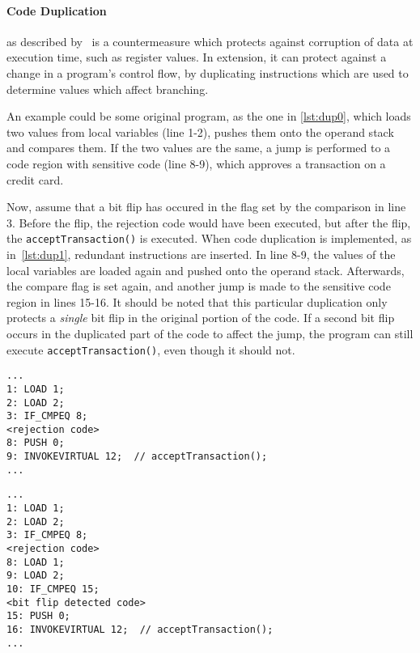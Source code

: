 \paragraph{Code Duplication}as described by~\cite[p. 12]{javasec} is a countermeasure which protects against corruption of data at execution time, such as register values. In extension, it can protect against a change in a program's control flow, by duplicating instructions which are used to determine values which affect branching.



An example could be some original program, as the one in \cref{lst:dup0}, which loads two values from local variables (line 1-2), pushes them onto the operand stack and compares them. If the two values are the same, a jump is performed to a code region with sensitive code (line 8-9), which approves a transaction on a credit card.




Now, assume that a bit flip has occured in the flag set by the comparison in line 3. Before the flip, the rejection code would have been executed, but after the flip, the \texttt{acceptTransaction()} is executed. When code duplication is implemented, as in~\cref{lst:dup1}, redundant instructions are inserted. In line 8-9, the values of the local variables are loaded again and pushed onto the operand stack. Afterwards, the compare flag is set again, and another jump is made to the sensitive code region in lines 15-16. It should be noted that this particular duplication only protects a \textit{single} bit flip in the original portion of the code. If a second bit flip occurs in the duplicated part of the code to affect the jump, the program can still execute \texttt{acceptTransaction()}, even though it should not.

\begin{minipage}{\linewidth}
\begin{lstlisting}[caption={Original program without code duplication implemented. The code is written in \jcl. Note that for simplicity, the numbers in the left side are line numbers and do not denote the program counter values.}, label={lst:dup0}]
...
1: LOAD 1;
2: LOAD 2;
3: IF_CMPEQ 8;
<rejection code>
8: PUSH 0;
9: INVOKEVIRTUAL 12;  // acceptTransaction();
...
\end{lstlisting}
\end{minipage}

\begin{minipage}{\linewidth}
\begin{lstlisting}[caption={Modified program with code duplication implemented. The code is written in \jcl. Note that for simplicity, the numbers in the left side are line numbers and do not denote the program counter values.}, label={lst:dup1}]
...
1: LOAD 1;
2: LOAD 2;
3: IF_CMPEQ 8;
<rejection code>
8: LOAD 1;
9: LOAD 2;
10: IF_CMPEQ 15;
<bit flip detected code>
15: PUSH 0;
16: INVOKEVIRTUAL 12;  // acceptTransaction();
...
\end{lstlisting}
\end{minipage}